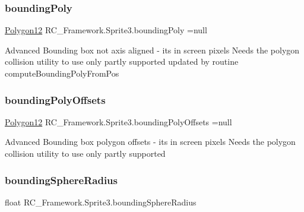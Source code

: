 \mbox{\label{class_r_c___framework_1_1_sprite3_a539da11d835c64da3a78039cd05942e9}} 
\subsubsection{\texorpdfstring{bounding\+Poly}{boundingPoly}}
{\footnotesize\ttfamily \mbox{\hyperlink{class_r_c___framework_1_1_polygon12}{Polygon12}} R\+C\+\_\+\+Framework.\+Sprite3.\+bounding\+Poly =null}



Advanced Bounding box not axis aligned -\/ its in screen pixels Needs the polygon collision utility to use only partly supported updated by routine compute\+Bounding\+Poly\+From\+Pos 

\mbox{\label{class_r_c___framework_1_1_sprite3_a38eaba03c71e388c288d36fbdf9cf9b6}} 
\subsubsection{\texorpdfstring{bounding\+Poly\+Offsets}{boundingPolyOffsets}}
{\footnotesize\ttfamily \mbox{\hyperlink{class_r_c___framework_1_1_polygon12}{Polygon12}} R\+C\+\_\+\+Framework.\+Sprite3.\+bounding\+Poly\+Offsets =null}



Advanced Bounding box polygon offsets -\/ its in screen pixels Needs the polygon collision utility to use only partly supported 

\mbox{\label{class_r_c___framework_1_1_sprite3_a6f76b1e09c665b5a930cb86c34c86429}} 
\subsubsection{\texorpdfstring{bounding\+Sphere\+Radius}{boundingSphereRadius}}
{\footnotesize\ttfamily float R\+C\+\_\+\+Framework.\+Sprite3.\+bounding\+Sphere\+Radius}



